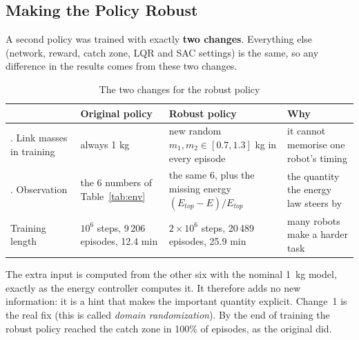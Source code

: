 \documentclass[12pt,a4paper]{article}
\begin{document}
\subsection{Making the Policy Robust}\label{sec:robust}
A second policy was trained with exactly \textbf{two changes}. Everything else (network, reward, catch zone, LQR and SAC settings) is the same, so any difference in the results comes from these two changes.
\begin{table}[H]
\centering
\caption{The two changes for the robust policy}
\label{tab:robustchanges}
\small
\begin{tabular}{|>{\raggedright\arraybackslash}p{2.5cm}|>{\raggedright\arraybackslash}p{3.0cm}|>{\raggedright\arraybackslash}p{4.6cm}|>{\raggedright\arraybackslash}p{4.0cm}|}
\hline
& \textbf{Original policy} & \textbf{Robust policy} & \textbf{Why}\\ \hline
1. Link masses in training & always 1 kg & new random $m_1,m_2\in[0.7,1.3]$ kg in every episode & it cannot memorise one robot's timing\\ \hline
2. Observation & the 6 numbers of Table~\ref{tab:env} & the same 6, plus the missing energy $(E_{top}-E)/E_{top}$ & the quantity the energy law steers by\\ \hline
Training length & $10^6$ steps, 9\,206 episodes, 12.4 min & $2\times10^6$ steps, 20\,489 episodes, 25.9 min & many robots make a harder task\\ \hline
\end{tabular}
\end{table}
The extra input is computed from the other six with the nominal 1~kg model, exactly as the energy controller computes it. It therefore adds no new information: it is a hint that makes the important quantity explicit. Change~1 is the real fix (this is called \emph{domain randomization}). By the end of training the robust policy reached the catch zone in 100\% of episodes, as the original did.
\end{document}
